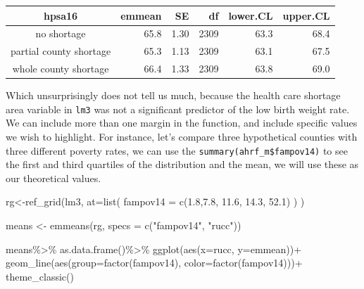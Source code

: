 \documentclass[
]{article}
\newenvironment{Shaded}{\begin{snugshade}}{\end{snugshade}}
\newcommand{\AttributeTok}[1]{\textcolor[rgb]{0.77,0.63,0.00}{#1}}
\newcommand{\FloatTok}[1]{\textcolor[rgb]{0.00,0.00,0.81}{#1}}
\newcommand{\FunctionTok}[1]{\textcolor[rgb]{0.00,0.00,0.00}{#1}}
\newcommand{\NormalTok}[1]{#1}
\newcommand{\OtherTok}[1]{\textcolor[rgb]{0.56,0.35,0.01}{#1}}
\newcommand{\SpecialCharTok}[1]{\textcolor[rgb]{0.00,0.00,0.00}{#1}}
\newcommand{\StringTok}[1]{\textcolor[rgb]{0.31,0.60,0.02}{#1}}
\begin{document}
\captionsetup[table]{labelformat=empty,skip=1pt}
\begin{longtable}{crrrrr}
\toprule
hpsa16 & emmean & SE & df & lower.CL & upper.CL \\ 
\midrule
no shortage & 65.8 & 1.30 & 2309 & 63.3 & 68.4 \\ 
partial county shortage & 65.3 & 1.13 & 2309 & 63.1 & 67.5 \\ 
whole county shortage & 66.4 & 1.33 & 2309 & 63.8 & 69.0 \\ 
\bottomrule
\end{longtable}

Which unsurprisingly does not tell us much, because the health care shortage area variable in \texttt{lm3} was not a significant predictor of the low birth weight rate. We can include more than one margin in the function, and include specific values we wish to highlight. For instance, let's compare three hypothetical counties with three different poverty rates, we can use the \texttt{summary(ahrf\_m\$fampov14)} to see the first and third quartiles of the distribution and the mean, we will use these as our theoretical values.

\begin{Shaded}
\begin{Highlighting}[]
\NormalTok{rg}\OtherTok{\textless{}{-}}\FunctionTok{ref\_grid}\NormalTok{(lm3,}
             \AttributeTok{at=}\FunctionTok{list}\NormalTok{( }\AttributeTok{fampov14 =} \FunctionTok{c}\NormalTok{(}\FloatTok{1.8}\NormalTok{,}\FloatTok{7.8}\NormalTok{, }\FloatTok{11.6}\NormalTok{, }\FloatTok{14.3}\NormalTok{, }\FloatTok{52.1}\NormalTok{) ) )}

\NormalTok{means }\OtherTok{\textless{}{-}} \FunctionTok{emmeans}\NormalTok{(rg, }\AttributeTok{specs =} \FunctionTok{c}\NormalTok{(}\StringTok{"fampov14"}\NormalTok{, }\StringTok{"rucc"}\NormalTok{))}

\NormalTok{means}\SpecialCharTok{\%\textgreater{}\%}
  \FunctionTok{as.data.frame}\NormalTok{()}\SpecialCharTok{\%\textgreater{}\%}
  \FunctionTok{ggplot}\NormalTok{(}\FunctionTok{aes}\NormalTok{(}\AttributeTok{x=}\NormalTok{rucc, }\AttributeTok{y=}\NormalTok{emmean))}\SpecialCharTok{+}
  \FunctionTok{geom\_line}\NormalTok{(}\FunctionTok{aes}\NormalTok{(}\AttributeTok{group=}\FunctionTok{factor}\NormalTok{(fampov14), }\AttributeTok{color=}\FunctionTok{factor}\NormalTok{(fampov14)))}\SpecialCharTok{+}
  \FunctionTok{theme\_classic}\NormalTok{()}
\end{Highlighting}
\end{Shaded}
\end{document}
